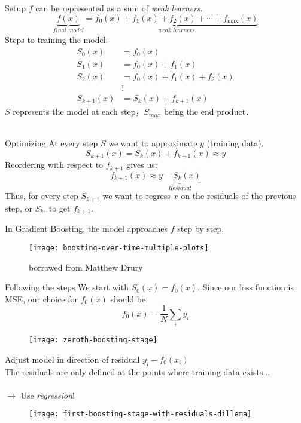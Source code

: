 \begin{frame}{Setup}
$f$ can be represented as a sum of \textit{weak learners}.
$$ \underbrace{f(x)}_{\textit{final model}} \!\!\!\!\! = \underbrace{f_0(x) + f_1(x) + f_2(x) + \cdots + f_{\text{max}}(x)}_{\textit{weak learners}} $$
Steps to training the model: 
\begin{align*}
    S_0(x) &= f_0(x) \\
    S_1(x) &= f_0(x) + f_1(x) \\
    S_2(x) &= f_0(x) + f_1(x) + f_2(x) \\
    &\vdots \\
    S_{k + 1} (x) &= S_{k}(x) + f_{k+1}(x)
\end{align*}
$S$ represents the model at each step，$S_{max}$ being the end product．\\~\\

\end{frame} 
%
\begin{frame}{Optimizing}
At every step $S$ we want to approximate $y$ (training data).
$$S_{k + 1} (x) = S_{k}(x) + f_{k+1}(x) \approx y$$
Reordering with respect to $f_{k+1}$ gives us:
$$f_{k + 1} (x) \approx \underbrace{y - S_{k}(x)}_{\textit{Residual}}$$
Thus, for every step $S_{k+1}$ we want to regress $x$ on the residuals of the previous step, or $S_k$, to get $f_{k+1}$.
\end{frame}
%
\begin{frame}
In Gradient Boosting, the model approaches $f$ step by step.

  \begin{figure}
    \texttt{[image: boosting-over-time-multiple-plots]}
    \caption{borrowed from Matthew Drury}
  \end{figure}
  
\end{frame}
%

\begin{frame}{Following the steps}
We start with $S_0(x) = f_0(x)$. Since our loss function is MSE, our choice for $f_0(x)$ should be:
$$ f_0(x) = \frac{1}{N} \sum_i y_i $$
  \begin{figure}
    \texttt{[image: zeroth-boosting-stage]}
  \end{figure}

\end{frame}
%

\begin{frame}
Adjust model in direction of residual $y_i - f_0(x_i)$ \\
The residuals are only defined at the points where training data exists... \\~\\
$\to$ Use \emph{regression}!

  \begin{figure}
   \texttt{[image: first-boosting-stage-with-residuals-dillema]}
  \end{figure}
  
\end{frame}
%

